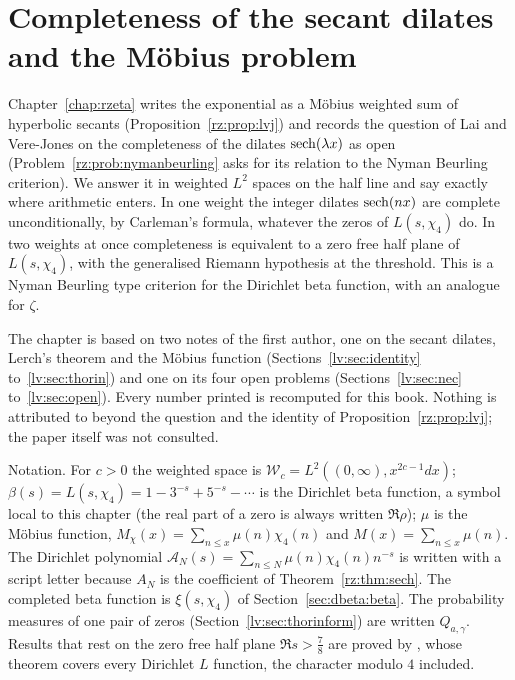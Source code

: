 \chapter{Completeness of the secant dilates and the M\"obius problem}\label{chap:lv}

Chapter~\ref{chap:rzeta} writes the exponential as a M\"obius weighted sum of hyperbolic secants (Proposition~\ref{rz:prop:lvj}) and records the question of Lai and Vere-Jones \cite{LVJ} on the completeness of the dilates $\operatorname{sech}(\lambda x)$ as open (Problem~\ref{rz:prob:nymanbeurling} asks for its relation to the Nyman Beurling criterion). We answer it in weighted $L^2$ spaces on the half line and say exactly where arithmetic enters. In one weight the integer dilates $\operatorname{sech}(nx)$ are complete unconditionally, by Carleman's formula, whatever the zeros of $L(s,\chi_4)$ do. In two weights at once completeness is equivalent to a zero free half plane of $L(s,\chi_4)$, with the generalised Riemann hypothesis at the threshold. This is a Nyman Beurling type criterion for the Dirichlet beta function, with an analogue for $\zeta$.

The chapter is based on two notes of the first author, one on the secant dilates, Lerch's theorem and the M\"obius function (Sections~\ref{lv:sec:identity} to~\ref{lv:sec:thorin}) and one on its four open problems (Sections~\ref{lv:sec:nec} to~\ref{lv:sec:open}). Every number printed is recomputed for this book. Nothing is attributed to \cite{LVJ} beyond the question and the identity of Proposition~\ref{rz:prop:lvj}; the paper itself was not consulted.

Notation. For $c>0$ the weighted space is $\mathcal W_c=L^2((0,\infty),x^{2c-1}dx)$; $\beta(s)=L(s,\chi_4)=1-3^{-s}+5^{-s}-\cdots$ is the Dirichlet beta function, a symbol local to this chapter (the real part of a zero is always written $\Re\rho$); $\mu$ is the M\"obius function, $M_\chi(x)=\sum_{n\le x}\mu(n)\chi_4(n)$ and $M(x)=\sum_{n\le x}\mu(n)$. The Dirichlet polynomial $\mathcal A_N(s)=\sum_{n\le N}\mu(n)\chi_4(n)n^{-s}$ is written with a script letter because $A_N$ is the coefficient of Theorem~\ref{rz:thm:sech}. The completed beta function is $\xi(s,\chi_4)$ of Section~\ref{sec:dbeta:beta}. The probability measures of one pair of zeros (Section~\ref{lv:sec:thorinform}) are written $Q_{a,\gamma}$. Results that rest on the zero free half plane $\Re s>\frac78$ are proved by \cite{OAI26a}, whose theorem covers every Dirichlet $L$ function, the character modulo $4$ included.

